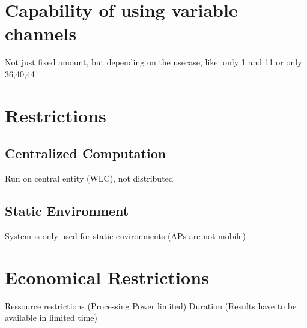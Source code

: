   \section{Capability of using variable channels}
  Not just fixed amount, but depending on the usecase, like: only 1 and 11 or only 36,40,44
  \section{Restrictions}
  \subsection{Centralized Computation}
    Run on central entity (WLC), not distributed \newline 
  \subsection{Static Environment}
    System is only used for static environments (APs are not mobile) \newline
\section{Economical Restrictions}
  Ressource restrictions (Processing Power limited) \newline
  Duration (Results have to be available in limited time) \newline
